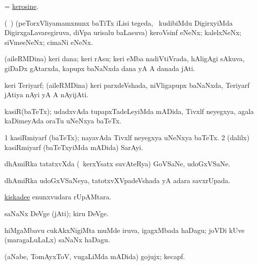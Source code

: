 \bentry
{}
\gl{\nA}
\bmng
 = \hyperlink{kerosine}{kerosine}. 
\emng
\eentry

\bentry
{}
\gl{\nA}
\bmng
(\kanmu\ \ame) (peTorxVliyamamxnunx baTiTx iLisi tegeda, \sA\ kudibiMdu  DigirxyiMda  DigirxgaLavaregiruva, diVpa urisalu baLasuva) keroVsinf eNeNx; kalelxNeNx; siVmeeNeNx; cimaNi eNeNx. 
\emng
\eentry

\bentry
{}
\gl{\nA}
\bmng
(aileRMDina) keri dana; keri rAsu; keri eMba nadiVtiVrada, hAligAgi sAkuva, giDaDx gAtarxda, kapupx baNaNxda dana yA A danada jAti. 
\emng
\eentry

\bentry
{}
\gl{\nA}
\bmng
keri Teriyarf; (aileRMDina) keri parxdeVshada, niVligapupx baNaNxda, Teriyarf jAtiya nAyi yA A nAyijAti.   
\emng
\eentry

\bentry
{}
\gl{\nA}
\bmng
kasiR(baTeTx); udadxvAda tupapxTadeLeyiMda mADida, Tivxlf neyegxya, agala kaDimeyAda oraTu uNeNxya baTeTx. 
\emng
\eentry

\bentry
{}
\gl{\nA}
\bmng
\bnum
\num{1} kasiRmiyarf (baTeTx); nayavAda Tivxlf neyegxya uNeNxya baTeTx. 
\num{2} (\bava dalilx) kasiRmiyarf (baTeTxyiMda mADida) SarAyi. 
\enum
\emng
\eentry

\bentry
{}
\gl{\nA}
\bmng
dhAmiRka tatatxvXda (\kanmu\ kerxYsatx suvAteRya) GoVSaNe, udoGxVSaNe. 
\emng
\eentry

\bentry
{}
\gl{\gu}
\bmng
dhAmiRka udoGxVSaNeya, tatotxvXVpadeVshada yA adara savxrUpada. 
\emng
\eentry

\bentry
{}
\gl{\nA}
\bmng
 \hyperlink{kiskadee}{kiskadee} enunxvudara rUpAMtara. 
\emng
\eentry

\bentry
{}
\gl{\nA}
\bmng
saNaNx DeVge (jAti); kiru DeVge. 
\emng
\eentry

\bentry
{}
\gl{\nA}
\bmng
hiMgaMbavu cukAkxNigiMta muMde iruva, igagxMbada haDagu; joVDi kUve (maragaLuLaLx) saNaNx haDagu.   
\emng
\eentry

\bentry
{}
\gl{\nA}
\bmng
(aNabe, TomAyxToV, \mo vugaLiMda mADida) gojujx; kecapf. 
\emng
\eentry


